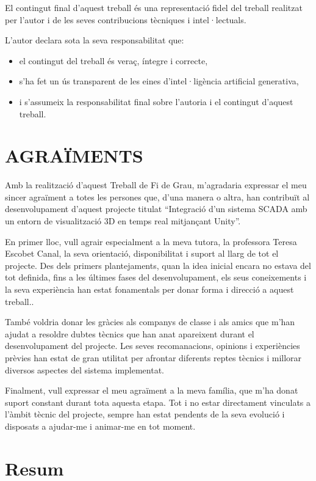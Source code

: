 \documentclass[a4paper,11pt,DIV=13,headings=normal,abstract=true,twoside=semi]{article}
\begin{document}
El contingut final d'aquest treball és una representació fidel del treball realitzat per l'autor i de les seves contribucions tècniques i intel·lectuals.

L'autor declara sota la seva responsabilitat que:

\begin{itemize}
    \item el contingut del treball és veraç, íntegre i correcte,
    
    \item s'ha fet un ús transparent de les eines d'intel·ligència artificial generativa,
    
    \item i s'assumeix la responsabilitat final sobre l'autoria i el contingut d'aquest treball.
\end{itemize}
\thispagestyle{empty}
\newpage
\section*{AGRAÏMENTS}

Amb la realització d'aquest Treball de Fi de Grau, m'agradaria expressar el meu sincer agraïment a totes les persones que, d'una manera o altra, han contribuït al desenvolupament d'aquest projecte titulat “Integració d'un sistema SCADA amb un entorn de visualització 3D en temps real mitjançant Unity”.

En primer lloc, vull agrair especialment a la meva tutora, la professora Teresa Escobet Canal, la seva orientació, disponibilitat i suport al llarg de tot el projecte. Des dels primers plantejaments, quan la idea inicial encara no estava del tot definida, fins a les últimes fases del desenvolupament, els seus coneixements i la seva experiència han estat fonamentals per donar forma i direcció a aquest treball..

També voldria donar les gràcies als companys de classe i als amics que m'han ajudat a resoldre dubtes tècnics que han anat apareixent durant el desenvolupament del projecte. Les seves recomanacions, opinions i experiències prèvies han estat de gran utilitat per afrontar diferents reptes tècnics i millorar diversos aspectes del sistema implementat.

Finalment, vull expressar el meu agraïment a la meva família, que m'ha donat suport constant durant tota aquesta etapa. Tot i no estar directament vinculats a l'àmbit tècnic del projecte, sempre han estat pendents de la seva evolució i disposats a ajudar-me i animar-me en tot moment.
\newpage
\section*{Resum}
\end{document}

